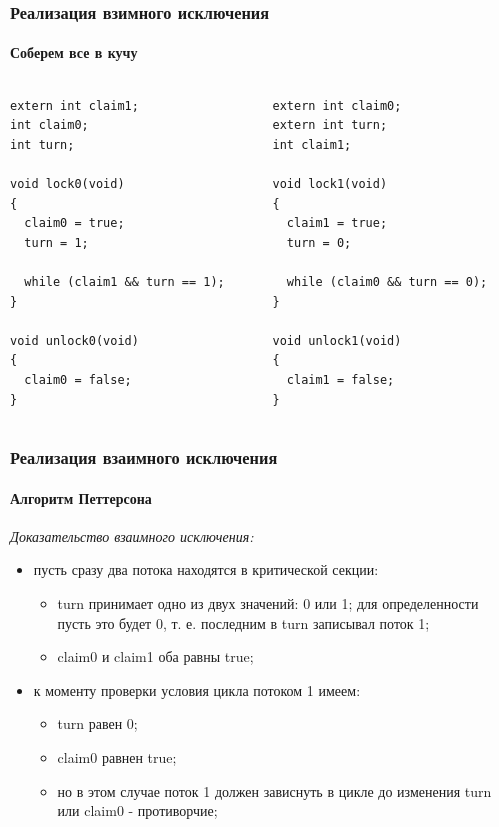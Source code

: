 \begin{frame}[fragile]
\frametitle{Реализация взимного исключения}
\framesubtitle{Соберем все в кучу}

\begin{columns}[T]
  \begin{column}{.45\linewidth}
    \begin{lstlisting}
extern int claim1;
int claim0;
int turn;

void lock0(void)
{
  claim0 = true;
  turn = 1;

  while (claim1 && turn == 1);
}

void unlock0(void)
{
  claim0 = false;
}
    \end{lstlisting}
  \end{column}
  \begin{column}{.45\linewidth}
    \begin{lstlisting}
extern int claim0;
extern int turn;
int claim1;

void lock1(void)
{
  claim1 = true;
  turn = 0;

  while (claim0 && turn == 0);
}

void unlock1(void)
{
  claim1 = false;
}
    \end{lstlisting}
  \end{column}
\end{columns}
\end{frame}

\begin{frame}
\frametitle{Реализация взаимного исключения}
\framesubtitle{Алгоритм Петтерсона}

\emph{Доказательство взаимного исключения:}
\begin{itemize}
  \item пусть сразу два потока находятся в критической секции:
        \begin{itemize}
          \item turn принимает одно из двух значений: 0 или 1; для
                определенности пусть это будет 0, т. е. последним в turn
                записывал поток 1;
          \item claim0 и claim1 оба равны true;
        \end{itemize}
  \item к моменту проверки условия цикла потоком 1 имеем:
        \begin{itemize}
          \item turn равен 0;
          \item claim0 равнен true;
          \item но в этом случае поток 1 должен зависнуть в цикле до изменения
                turn или claim0 - противорчие;
        \end{itemize}
\end{itemize}
\end{frame}

